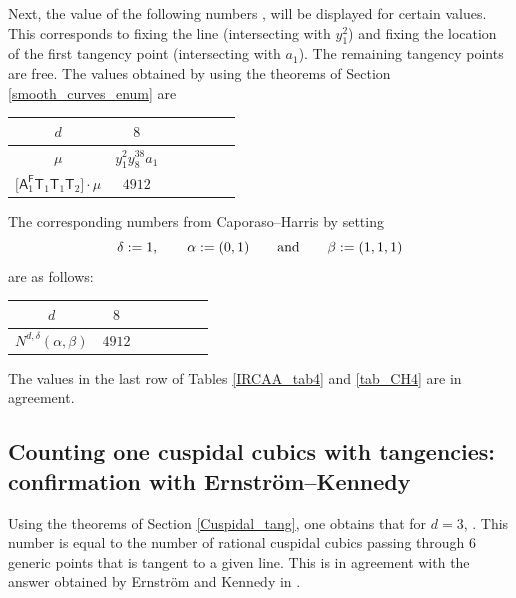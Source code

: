 \documentclass[pdftex]{sigma}
\numberwithin{equation}{section}
\begin{document}
Next, the value of the following numbers
,
will be displayed for certain values. This corresponds to fixing the line (intersecting with $y_1^2$)
and fixing the location of the first tangency point (intersecting with $a_1$). The remaining tangency points
are free.
The values obtained by
using the theorems of Section \ref{smooth_curves_enum} are
\begin{center}\renewcommand{\arraystretch}{1.2}
\begin{tabular}{|c|c|c|c|c|c|c|}
\hline
$d$ & $8$ \\
\hline
$\mu$ & $y_1^2 y_8^{38}a_1$ \\
\hline
$\bigl[\mathsf{A}_1^{\mathsf{F}}\mathsf{T}_{1} \mathsf{T}_{1} \mathsf{T}_{2}\bigr] \cdot \mu$ & $4912$ \\
\hline
\end{tabular}
 \label{IRCAA_tab4}
\end{center}
The corresponding numbers from Caporaso--Harris
by setting
\[\delta:=1, \qquad \alpha:= (0,1) \qquad \textnormal{and} \qquad \beta:=(1,1,1)\]
are as follows:
\begin{center}\renewcommand{\arraystretch}{1.2}
\begin{tabular}{|c|c|c|c|c|c|c|}
\hline
$d$ & $8$ \\
\hline
$N^{d,\delta}(\alpha, \beta)$
 & $4912$ \\
\hline
\end{tabular}
 \label{tab_CH4}
\end{center}
The values
in the last row of Tables \ref{IRCAA_tab4} and \ref{tab_CH4}
are in agreement.


\subsection[Counting one cuspidal cubics with tangencies: confirmation with Ernstr\"om-Kennedy]{Counting one cuspidal cubics with tangencies:\\ confirmation with Ernstr\"om--Kennedy}

Using the theorems of Section \ref{Cuspidal_tang}, one obtains that for $d = 3$,
.
This number is equal to the number of rational cuspidal cubics passing through
$6$ generic points that
is tangent to a given line. This is in agreement with
the answer obtained by Ernstr{\"o}m and Kennedy in \cite{ken}.
\end{document}
